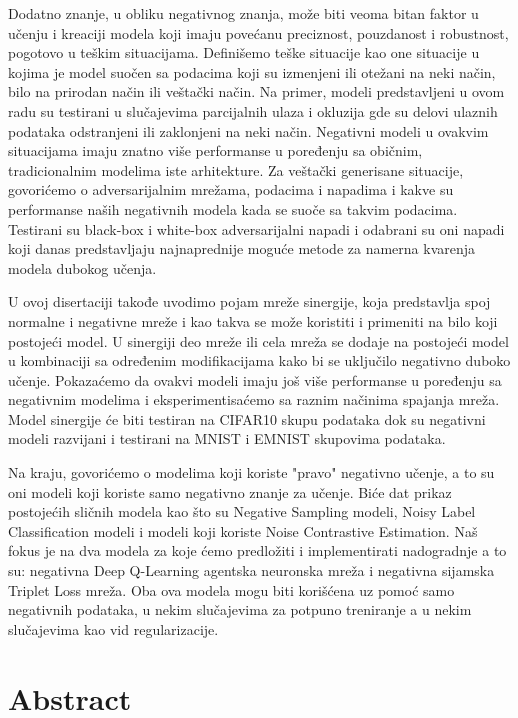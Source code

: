 \documentclass[b5paper]{book}
\begin{document}
Dodatno znanje, u obliku negativnog znanja, može biti veoma bitan faktor u učenju i kreaciji modela koji imaju povećanu preciznost, pouzdanost i robustnost, pogotovo u teškim situacijama. Definišemo teške situacije kao one situacije u kojima je model suočen sa podacima koji su izmenjeni ili otežani na neki način, bilo na prirodan način ili veštački način. Na primer, modeli predstavljeni u ovom radu su testirani u slučajevima parcijalnih ulaza i okluzija gde su delovi ulaznih podataka odstranjeni ili zaklonjeni na neki način. Negativni modeli u ovakvim situacijama imaju znatno više performanse u poređenju sa običnim, tradicionalnim modelima iste arhitekture. Za veštački generisane situacije, govorićemo o adversarijalnim mrežama, podacima i napadima i kakve su performanse naših negativnih modela kada se suoče sa takvim podacima. Testirani su black-box i white-box adversarijalni napadi i odabrani su oni napadi koji danas predstavljaju najnaprednije moguće metode za namerna kvarenja modela dubokog učenja.

U ovoj disertaciji takođe uvodimo pojam mreže sinergije, koja predstavlja spoj normalne i negativne mreže i kao takva se može koristiti i primeniti na bilo koji postojeći model. U sinergiji deo mreže ili cela mreža se dodaje na postojeći model u kombinaciji sa određenim modifikacijama kako bi se uključilo negativno duboko učenje. Pokazaćemo da ovakvi modeli imaju još više performanse u poređenju sa negativnim modelima i eksperimentisaćemo sa raznim načinima spajanja mreža. Model sinergije će biti testiran na CIFAR10 skupu podataka dok su negativni modeli razvijani i testirani na MNIST i EMNIST skupovima podataka.

Na kraju, govorićemo o modelima koji koriste "pravo" negativno učenje, a to su oni modeli koji koriste samo negativno znanje za učenje. Biće dat prikaz postojećih sličnih modela kao što su Negative Sampling modeli, Noisy Label Classification modeli i modeli koji koriste Noise Contrastive Estimation. Naš fokus je na dva modela za koje ćemo predložiti i implementirati nadogradnje a to su: negativna Deep Q-Learning agentska neuronska mreža i negativna sijamska Triplet Loss mreža. Oba ova modela mogu biti korišćena uz pomoć samo negativnih podataka, u nekim slučajevima za potpuno treniranje a u nekim slučajevima kao vid regularizacije.

\chapter{Abstract}
\end{document}
